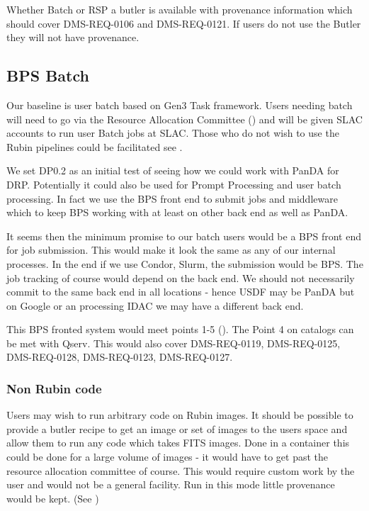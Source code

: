 Whether Batch or RSP a butler is available with provenance information which should cover DMS-REQ-0106 and DMS-REQ-0121.
If users do not use the Butler they will not have provenance.

\subsection{BPS Batch }\label{sec:bpsbatch}

Our baseline is user batch based on Gen3 Task framework.
Users needing batch will need to go via the Resource Allocation Committee () and
will be given SLAC accounts to run user Batch jobs at SLAC.
Those who do not wish to use the Rubin pipelines could be facilitated see .


We set DP0.2 as an initial test of seeing how we could work with PanDA 
for DRP. Potentially it could also be used for Prompt Processing and user batch processing.
In fact we use the BPS front end to submit jobs and middleware which to keep BPS working with at least on other back end as well as PanDA.

It seems then the minimum promise to our batch users would be a BPS front end for job submission.
This would make it look the same as any of our internal processes.
In the end if we use Condor, Slurm, the submission would be BPS.
The job tracking of course would depend on the back end.
We should not necessarily commit to the same back end in all locations - hence USDF may be PanDA but on Google or an processing IDAC we may have a different back end.

This BPS fronted system would meet  points 1-5 (). The Point 4 on catalogs can be met with Qserv.
This would also cover DMS-REQ-0119, DMS-REQ-0125, DMS-REQ-0128, DMS-REQ-0123, DMS-REQ-0127.


\subsubsection{Non Rubin code} \label{sec:othercode}
Users may wish to run arbitrary code on Rubin images.
It should be possible to provide a butler recipe to get an image or set of images to the users space and allow them to run any code which takes FITS images.
Done in a container this could be done for a large volume of images - it would have to get past  the resource allocation committee of course.
This would require custom work by the user and would not be a general facility.
Run in this mode little provenance would be kept.  (See )

